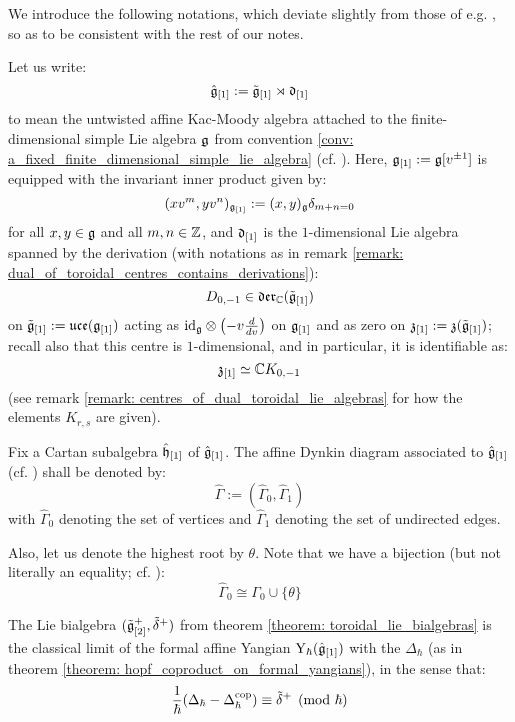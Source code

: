     \begin{convention} \label{conv: a_fixed_untwisted_affine_kac_moody_algebra}
            We introduce the following notations, which deviate slightly from those of e.g. \cite[Chapter 7]{kac_infinite_dimensional_lie_algebras}, so as to be consistent with the rest of our notes.
        
            Let us write:
                $$\hat{\mathfrak{g}}_{[1]} := \tilde{\mathfrak{g}}_{[1]} \rtimes \mathfrak{d}_{[1]}$$
            to mean the untwisted affine Kac-Moody algebra attached to the finite-dimensional simple Lie algebra $\mathfrak{g}$ from convention \ref{conv: a_fixed_finite_dimensional_simple_lie_algebra} (cf. \cite[Chapter 7]{kac_infinite_dimensional_lie_algebras}). Here, $\mathfrak{g}_{[1]} := \mathfrak{g}[v^{\pm 1}]$ is equipped with the invariant inner product given by:
                $$(x v^m, y v^n)_{\mathfrak{g}_{[1]}} := (x, y)_{\mathfrak{g}} \delta_{m + n = 0}$$
            for all $x, y \in \mathfrak{g}$ and all $m, n \in \mathbb{Z}$, and $\mathfrak{d}_{[1]}$ is the $1$-dimensional Lie algebra spanned by the derivation (with notations as in remark \ref{remark: dual_of_toroidal_centres_contains_derivations}):
                $$D_{0, -1} \in \mathfrak{der}_{\mathbb{C}}(\tilde{\mathfrak{g}}_{[1]})$$
            on $\tilde{\mathfrak{g}}_{[1]} := \mathfrak{uce}(\mathfrak{g}_{[1]})$ acting as $\id_{\g} \tensor \left( -v \frac{d}{dv} \right)$ on $\mathfrak{g}_{[1]}$ and as zero on $\mathfrak{z}_{[1]} := \mathfrak{z}(\tilde{\mathfrak{g}}_{[1]})$; recall also that this centre is $1$-dimensional, and in particular, it is identifiable as:
                $$\mathfrak{z}_{[1]} \simeq \mathbb{C} K_{0, -1}$$
            (see remark \ref{remark: centres_of_dual_toroidal_lie_algebras} for how the elements $K_{r, s}$ are given).

            Fix a Cartan subalgebra $\hat{\mathfrak{h}}_{[1]}$ of $\hat{\mathfrak{g}}_{[1]}$. The affine Dynkin diagram associated to $\hat{\mathfrak{g}}_{[1]}$ (cf. \cite[Chapter 4]{kac_infinite_dimensional_lie_algebras}) shall be denoted by:
                $$\hat{\Gamma} := ( \hat{\Gamma}_0, \hat{\Gamma}_1 )$$
            with $\hat{\Gamma}_0$ denoting the set of vertices and $\hat{\Gamma}_1$ denoting the set of undirected edges.

            Also, let us denote the highest root by $\theta$. Note that we have a bijection (but not literally an equality; cf. \cite[Chapters 4, 5, 7]{kac_infinite_dimensional_lie_algebras}):
                $$\hat{\Gamma}_0 \cong \Gamma_0 \cup \{\theta\}$$
        \end{convention}
    \begin{theorem} \label{theorem: toroidal_lie_algebras_as_classical_limits_of_formal_affine_yangians}
           The Lie bialgebra $(\tilde{\mathfrak{g}}_{[2]}^+, \tilde{\delta}^+)$ from theorem \ref{theorem: toroidal_lie_bialgebras} is the classical limit of the formal affine Yangian $\mathrm{Y}_{\hbar}(\hat{\mathfrak{g}}_{[1]})$ with the  $\Delta_{\hbar}$ (as in theorem \ref{theorem: hopf_coproduct_on_formal_yangians}), in the sense that:
                $$\frac{1}{\hbar}( \Delta_{\hbar} - \Delta_{\hbar}^{\mathrm{cop}} ) \equiv \tilde{\delta}^+ \pmod{\hbar}$$
        \end{theorem}
